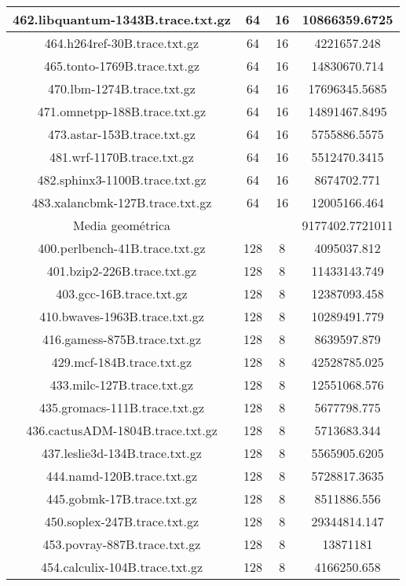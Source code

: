 \begin{table}[H]
\begin{center}
{\begin{tabular}{|c|c|c|c|}
		\hline
		462.libquantum-1343B.trace.txt.gz	&	64	&	16	&	10866359.6725	\\
		\hline
		464.h264ref-30B.trace.txt.gz	&	64	&	16	&	4221657.248	\\
		\hline
		465.tonto-1769B.trace.txt.gz	&	64	&	16	&	14830670.714	\\
		\hline
		470.lbm-1274B.trace.txt.gz	&	64	&	16	&	17696345.5685	\\
		\hline
		471.omnetpp-188B.trace.txt.gz	&	64	&	16	&	14891467.8495	\\
		\hline
		473.astar-153B.trace.txt.gz	&	64	&	16	&	5755886.5575	\\
		\hline
		481.wrf-1170B.trace.txt.gz	&	64	&	16	&	5512470.3415	\\
		\hline
		482.sphinx3-1100B.trace.txt.gz	&	64	&	16	&	8674702.771	\\
		\hline
		483.xalancbmk-127B.trace.txt.gz	&	64	&	16	&	12005166.464	\\
		\hline
		\hline
		Media	geométrica	&		&	&	9177402.7721011	\\
		\hline
		400.perlbench-41B.trace.txt.gz	&	128	&	8	&	4095037.812	\\
		\hline
		401.bzip2-226B.trace.txt.gz	&	128	&	8	&	11433143.749	\\
		\hline
		403.gcc-16B.trace.txt.gz	&	128	&	8	&	12387093.458	\\
		\hline
		410.bwaves-1963B.trace.txt.gz	&	128	&	8	&	10289491.779	\\
		\hline
		416.gamess-875B.trace.txt.gz	&	128	&	8	&	8639597.879	\\
		\hline
		429.mcf-184B.trace.txt.gz	&	128	&	8	&	42528785.025	\\
		\hline
		433.milc-127B.trace.txt.gz	&	128	&	8	&	12551068.576	\\
		\hline
		435.gromacs-111B.trace.txt.gz	&	128	&	8	&	5677798.775	\\
		\hline
		436.cactusADM-1804B.trace.txt.gz	&	128	&	8	&	5713683.344	\\
		\hline
		437.leslie3d-134B.trace.txt.gz	&	128	&	8	&	5565905.6205	\\
		\hline
		444.namd-120B.trace.txt.gz	&	128	&	8	&	5728817.3635	\\
		\hline
		445.gobmk-17B.trace.txt.gz	&	128	&	8	&	8511886.556	\\
		\hline
		450.soplex-247B.trace.txt.gz	&	128	&	8	&	29344814.147	\\
		\hline
		453.povray-887B.trace.txt.gz	&	128	&	8	&	13871181	\\
		\hline
		454.calculix-104B.trace.txt.gz	&	128	&	8	&	4166250.658	\\

\end{tabular}}
\end{center}
\end{table}

